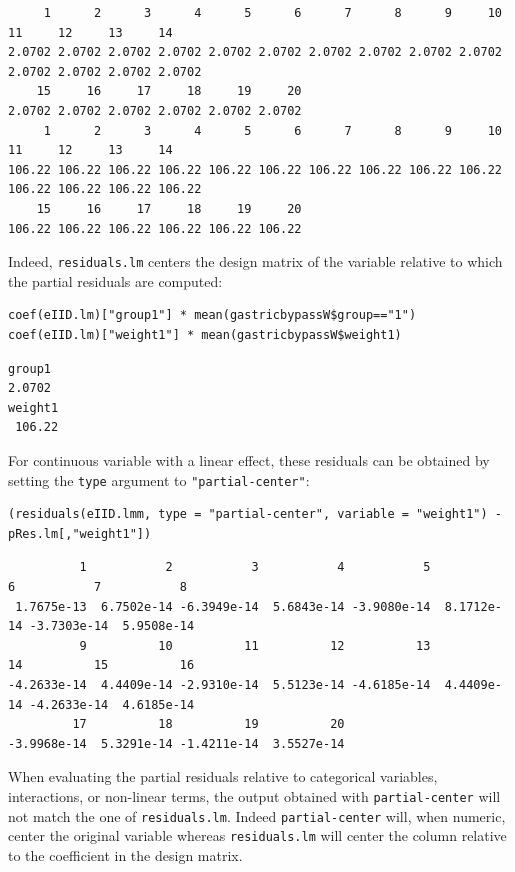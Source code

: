 \documentclass[12pt]{article}
\newcommand\Warning[1][3ex]{%
\renewcommand\stacktype{L}%
\scaleto{\stackon[1.3pt]{\color{red}$\triangle$}{\tiny\bfseries !}}{#1}%
\xspace
}
\begin{document}
\begin{verbatim}
     1      2      3      4      5      6      7      8      9     10     11     12     13     14 
2.0702 2.0702 2.0702 2.0702 2.0702 2.0702 2.0702 2.0702 2.0702 2.0702 2.0702 2.0702 2.0702 2.0702 
    15     16     17     18     19     20 
2.0702 2.0702 2.0702 2.0702 2.0702 2.0702
     1      2      3      4      5      6      7      8      9     10     11     12     13     14 
106.22 106.22 106.22 106.22 106.22 106.22 106.22 106.22 106.22 106.22 106.22 106.22 106.22 106.22 
    15     16     17     18     19     20 
106.22 106.22 106.22 106.22 106.22 106.22
\end{verbatim}


Indeed, \texttt{residuals.lm} centers the design matrix of the variable
relative to which the partial residuals are computed:
\lstset{language=r,label= ,caption= ,captionpos=b,numbers=none}
\begin{lstlisting}
coef(eIID.lm)["group1"] * mean(gastricbypassW$group=="1")
coef(eIID.lm)["weight1"] * mean(gastricbypassW$weight1)
\end{lstlisting}

\begin{verbatim}
group1 
2.0702
weight1 
 106.22
\end{verbatim}


For continuous variable with a linear effect, these residuals can be
obtained by setting the \texttt{type} argument to \texttt{"partial-center"}:
\lstset{language=r,label= ,caption= ,captionpos=b,numbers=none}
\begin{lstlisting}
(residuals(eIID.lmm, type = "partial-center", variable = "weight1") - pRes.lm[,"weight1"])
\end{lstlisting}

\begin{verbatim}
          1           2           3           4           5           6           7           8 
 1.7675e-13  6.7502e-14 -6.3949e-14  5.6843e-14 -3.9080e-14  8.1712e-14 -3.7303e-14  5.9508e-14 
          9          10          11          12          13          14          15          16 
-4.2633e-14  4.4409e-14 -2.9310e-14  5.5123e-14 -4.6185e-14  4.4409e-14 -4.2633e-14  4.6185e-14 
         17          18          19          20 
-3.9968e-14  5.3291e-14 -1.4211e-14  3.5527e-14
\end{verbatim}


\Warning When evaluating the partial residuals relative to categorical
variables, interactions, or non-linear terms, the output obtained with
\texttt{partial-center} will not match the one of \texttt{residuals.lm}. Indeed
\texttt{partial-center} will, when numeric, center the original variable
whereas \texttt{residuals.lm} will center the column relative to the
coefficient in the design matrix.
\end{document}
